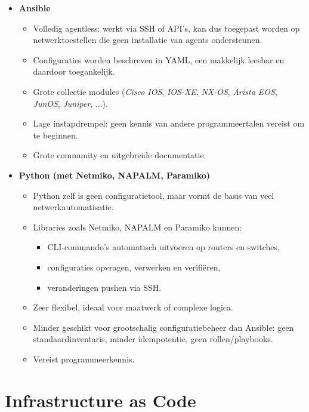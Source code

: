 \begin{itemize}
  \item \textbf{Ansible}  \autocite{AnsibleDocs}
        \begin{itemize}
          \item Volledig agentless: werkt via SSH of API's, kan dus toegepast worden op netwerktoestellen die geen installatie van agents ondersteunen.
          \item Configuraties worden beschreven in YAML, een makkelijk leesbar en daardoor toegankelijk.
          \item Grote collectie modules (\emph{Cisco IOS}, \emph{IOS-XE}, \emph{NX-OS}, \emph{Arista EOS}, \emph{JunOS}, \emph{Juniper}, ...). \autocite{AnsibleCommunityNetworkModules}
          \item Lage instapdrempel: geen kennis van andere programmeertalen vereist om te beginnen.
          \item Grote community en uitgebreide documentatie.
        \end{itemize}


  \item \textbf{Python (met Netmiko, NAPALM, Paramiko)}  
        \begin{itemize}
          \item Python zelf is geen configuratietool, maar vormt de basis van veel netwerkautomatisatie.
          \item Libraries zoals Netmiko, NAPALM en Paramiko kunnen:
                \begin{itemize}
                  \item CLI-commando's automatisch uitvoeren op routers en switches,
                  \item configuraties opvragen, verwerken en verifiëren,
                  \item veranderingen pushen via SSH.
                \end{itemize}
          \item Zeer flexibel, ideaal voor maatwerk of complexe logica.
          \item Minder geschikt voor grootschalig configuratiebeheer dan Ansible:
                geen standaardinventaris, minder idempotentie, geen rollen/playbooks.
          \item Vereist programmeerkennis.
        \end{itemize}

\end{itemize}

\section{Infrastructure as Code}
\label{sec:iac}

